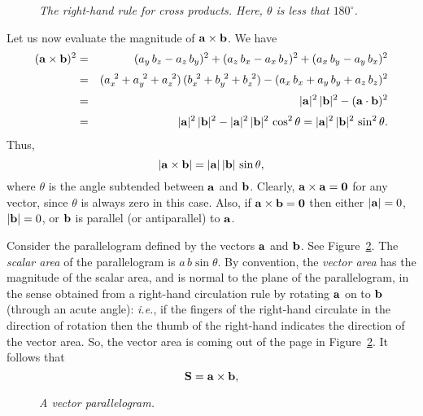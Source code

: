 \begin{figure}
\epsfysize=1.75in
\centerline{}
\caption{\em The right-hand rule for cross products. Here, $\theta$ is less that $180^\circ$.}\label{f6}
\end{figure}

Let us now evaluate the magnitude of ${\bf a}\times {\bf b}$. We have
\begin{eqnarray}
({\bf a}\times{\bf b})^2 &=& (a_y \,b_z-a_z\, b_y)^2 +(a_z \,b_x - a_x\, b_z)^2 +(a_x \,b_y
-a_y \,b_x)^2\nonumber\\[0.5ex]
&=& (a_x^{~2}+a_y^{~2}+a_z^{~2})\,(b_x^{~2}+b_y^{~2}+b_z^{~2}) -
(a_x\, b_x + a_y \,b_y + a_z\, b_z)^2\nonumber\\[0.5ex]
&=& |{\bf a}|^2 \,|{\bf b}|^2 - ({\bf a}\cdot {\bf b})^2\nonumber\\[0.5ex]
&=& |{\bf a}|^2 \,|{\bf b}|^2 - |{\bf a}|^2 \,|{\bf b}|^2 \,\cos^2\theta = |{\bf a}|^2\,|{\bf b}|^2\, \sin^2\theta.
\end{eqnarray}
Thus,
\begin{equation}
|{\bf a}\times{\bf b}| = |{\bf a}|\,|{\bf b}|\,\sin\theta,
\end{equation}
where $\theta$ is the angle subtended between ${\bf a}$ and ${\bf b}$.
Clearly, ${\bf a}\times{\bf a} = {\bf 0}$ for any vector, since $\theta$ is always
zero in this case. Also, if ${\bf a}\times{\bf b} = {\bf 0}$ then either
$|{\bf a}|=0$, $|{\bf b}|=0$, or ${\bf b}$ is parallel (or antiparallel) to ${\bf a}$.

Consider the parallelogram defined by the vectors ${\bf a}$ and ${\bf b}$. See Figure~\ref{f7}.
The {\em scalar area}\/ of the parallelogram is $a\,b \sin\theta$. By convention, the {\em vector area}\/ has the magnitude of the
scalar area, and is normal to the plane of the parallelogram, in the sense obtained from a right-hand circulation rule by rotating ${\bf a}$ on to
${\bf b}$ (through an acute angle): {\em i.e.}, if the fingers of the right-hand circulate in the direction of
rotation then the thumb of the right-hand indicates the direction of the vector area. So, the vector area is coming out of the
page in Figure~\ref{f7}.
It follows that
\begin{equation}
{\bf S} = {\bf a}\times {\bf b},
\end{equation}

\begin{figure}[b]
\epsfysize=1.25in
\centerline{}
\caption{\em A vector parallelogram.}\label{f7}
\end{figure}

